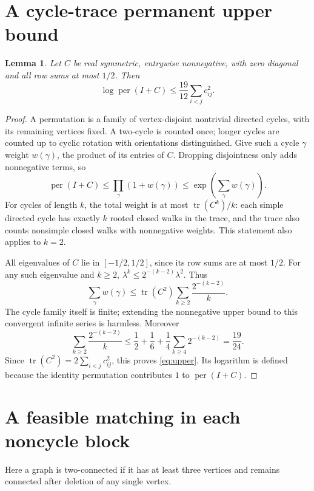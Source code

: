 \documentclass[11pt]{article}
\newtheorem{lemma}[theorem]{Lemma}
\theoremstyle{remark}\newtheorem{remark}[theorem]{Remark}
\DeclareMathOperator{\per}{per}
\DeclareMathOperator{\tr}{tr}
\begin{document}
\section{A cycle-trace permanent upper bound}\label{sec:trace}
\begin{lemma}\label{lem:upper}
Let $C$ be real symmetric, entrywise nonnegative, with zero diagonal
and all row sums at most $1/2$. Then
\begin{equation}\label{eq:upper}
\log\per(I+C)\le\frac{19}{12}\sum_{i<j}c_{ij}^2.
\end{equation}
\end{lemma}
\begin{proof}
A permutation is a family of vertex-disjoint nontrivial directed cycles,
with its remaining vertices fixed. A two-cycle is counted once; longer
cycles are counted up to cyclic rotation with orientations distinguished.
Give such a cycle $\gamma$ weight $w(\gamma)$, the product of its entries
of $C$. Dropping disjointness only adds nonnegative terms, so
\[
\per(I+C)\le\prod_{\gamma}(1+w(\gamma))
\le \exp\left(\sum_{\gamma}w(\gamma)\right).
\]
For cycles of length $k$, the total weight is at most $\tr(C^k)/k$:
each simple directed cycle has exactly $k$ rooted closed walks in the
trace, and the trace also counts nonsimple closed walks with nonnegative
weights. This statement also applies to $k=2$.

All eigenvalues of $C$ lie in $[-1/2,1/2]$, since its row sums are at
most $1/2$. For any such eigenvalue and $k\ge2$,
$\lambda^k\le2^{-(k-2)}\lambda^2$. Thus
\[
\sum_{\gamma}w(\gamma)
\le\tr(C^2)\sum_{k\ge2}\frac{2^{-(k-2)}}k.
\]
The cycle family itself is finite; extending the nonnegative upper bound
to this convergent infinite series is harmless. Moreover
\[
\sum_{k\ge2}\frac{2^{-(k-2)}}k
\le\frac12+\frac16+\frac14\sum_{k\ge4}2^{-(k-2)}
=\frac{19}{24}.
\]
Since $\tr(C^2)=2\sum_{i<j}c_{ij}^2$, this proves
\eqref{eq:upper}. Its logarithm is defined because the identity
permutation contributes $1$ to $\per(I+C)$.
\end{proof}

\section{A feasible matching in each noncycle block}\label{sec:matching}
Here a graph is two-connected if it has at least three vertices and
remains connected after deletion of any single vertex.
\end{document}

